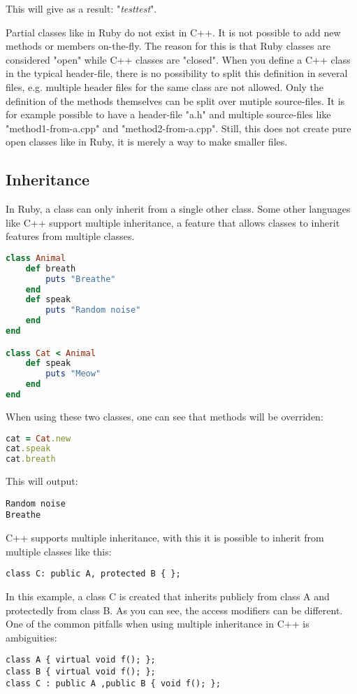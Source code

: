 \documentclass[10pt,a4paper,twocolumn]{article}
\begin{document}
This will give as a result: "\textit{testtest}".

Partial classes like in Ruby do not exist in C++. It is not possible to add new methods or members on-the-fly. The reason for this is that Ruby classes are considered "open" while C++ classes are "closed". When you define a C++ class in the typical header-file, there is no possibility to split this definition in several files, e.g. multiple header files for the same class are not allowed. Only the definition of the methods themselves can be split over mutiple source-files. It is for example possible to have a header-file "a.h" and multiple source-files like "method1-from-a.cpp" and "method2-from-a.cpp". Still, this does not create pure open classes like in Ruby, it is merely a way to make smaller files.

\subsection{Inheritance}
In Ruby, a class can only inherit from a single other class. Some other languages like C++ support multiple inheritance, a feature that allows classes to inherit features from multiple classes.
\begin{lstlisting}[language=Ruby]
class Animal
	def breath
		puts "Breathe"
	end
	def speak
		puts "Random noise"
	end
end

class Cat < Animal
	def speak
		puts "Meow"
	end
end
\end{lstlisting}
When using these two classes, one can see that methods will be overriden:
\begin{lstlisting}[language=Ruby]
cat = Cat.new
cat.speak
cat.breath
\end{lstlisting}
This will output:
\begin{lstlisting}
Random noise
Breathe
\end{lstlisting}

C++ supports multiple inheritance, with this it is possible to inherit from multiple classes like this:

\begin{lstlisting}
class C: public A, protected B { };
\end{lstlisting}

In this example, a class C is created that inherits publicly from class A and protectedly from class B. As you can see, the access modifiers can be different. One of the common pitfalls when using multiple inheritance in C++ is ambiguities:

\begin{lstlisting}
class A { virtual void f(); };
class B { virtual void f(); };
class C : public A ,public B { void f(); };
\end{lstlisting}
\end{document}
